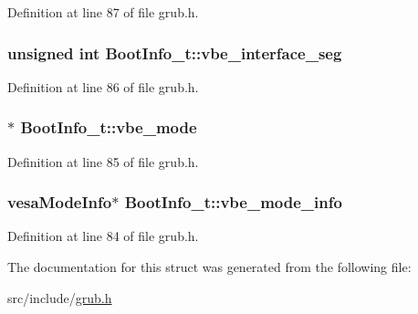 Definition at line 87 of file grub.\+h.

\hypertarget{structBootInfo__t_a878cf7a1a61c7b7d21b704feee0fcc60}{
\subsubsection[{vbe\+\_\+interface\+\_\+seg}]{\setlength{\rightskip}{0pt plus 5cm}unsigned int Boot\+Info\+\_\+t\+::vbe\+\_\+interface\+\_\+seg}}\label{structBootInfo__t_a878cf7a1a61c7b7d21b704feee0fcc60}


Definition at line 86 of file grub.\+h.

\hypertarget{structBootInfo__t_a55a278b70ee059fd245f08f3293440d9}{
\subsubsection[{vbe\+\_\+mode}]{$\ast$ Boot\+Info\+\_\+t\+::vbe\+\_\+mode}}\label{structBootInfo__t_a55a278b70ee059fd245f08f3293440d9}


Definition at line 85 of file grub.\+h.

\hypertarget{structBootInfo__t_ad583d2ecbdc34a87c6ab29a2fded69b6}{
\subsubsection[{vbe\+\_\+mode\+\_\+info}]{\setlength{\rightskip}{0pt plus 5cm}vesa\+Mode\+Info$\ast$ Boot\+Info\+\_\+t\+::vbe\+\_\+mode\+\_\+info}}\label{structBootInfo__t_ad583d2ecbdc34a87c6ab29a2fded69b6}


Definition at line 84 of file grub.\+h.



The documentation for this struct was generated from the following file\+:\begin{DoxyCompactItemize}
\item 
src/include/\hyperlink{grub_8h}{grub.\+h}\end{DoxyCompactItemize}
